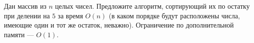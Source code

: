 \documentclass{article}
\begin{document}
Дан массив из $n$ целых чисел. Предложите алгоритм, сортирующий их по остатку при делении на $5$ за время $O(n)$ (в каком порядке будут расположены числа, имеющие один и тот же остаток, неважно). Ограничение по дополнительной памяти --- $O(1)$.
\end{document}
